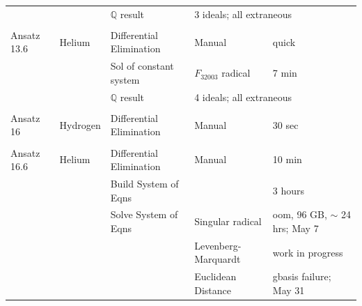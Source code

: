 \documentclass{article}
\def\R32003{$F_{32003}$}
\begin{document}
\begin{longtable}{lllll}
           &               &$\mathbb{Q}$ result                 &\multicolumn{2}{l}{3 ideals; all extraneous}\\
           &               &                         &                      &\\
Ansatz 13.6&Helium         &Differential Elimination &Manual                &quick\\
           &               &Sol of constant system   &\R32003 radical             &7 min\\
           &               &$\mathbb{Q}$ result                 &\multicolumn{2}{l}{4 ideals; all extraneous}\\
           &               &                         &                      &\\
Ansatz 16  &Hydrogen       &Differential Elimination &Manual                &30 sec\\
           &               &                         &                      &\\
Ansatz 16.6&Helium         &Differential Elimination &Manual                &10 min\\
           &               &Build System of Eqns     &                      &3 hours\\
           &               &Solve System of Eqns     &Singular radical      &oom, 96 GB, $\sim$ 24 hrs; May 7\\
           &               &                         &Levenberg-Marquardt   &work in progress\\
           &               &                         &Euclidean Distance    &gbasis failure; May 31\\
\end{longtable}
\end{document}
